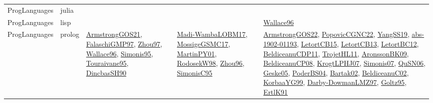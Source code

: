 {\begin{longtable}{lp{3cm}>{\raggedright}p{6cm}>{\raggedright}p{6cm}p{8cm}}
ProgLanguages & julia  &  &  & \\
ProgLanguages & lisp &  &  & \href{articles/Wallace96.pdf}{Wallace96}\cite{Wallace96}\\
ProgLanguages & prolog & \href{papers/ArmstrongGOS21.pdf}{ArmstrongGOS21}\cite{ArmstrongGOS21}, \href{articles/FalaschiGMP97.pdf}{FalaschiGMP97}\cite{FalaschiGMP97}, \href{articles/Zhou97.pdf}{Zhou97}\cite{Zhou97}, \href{articles/Wallace96.pdf}{Wallace96}\cite{Wallace96}, \href{papers/Simonis95.pdf}{Simonis95}\cite{Simonis95}, \href{papers/Touraivane95.pdf}{Touraivane95}\cite{Touraivane95}, \href{articles/DincbasSH90.pdf}{DincbasSH90}\cite{DincbasSH90} & \href{papers/Madi-WambaLOBM17.pdf}{Madi-WambaLOBM17}\cite{Madi-WambaLOBM17}, \href{papers/MossigeGSMC17.pdf}{MossigeGSMC17}\cite{MossigeGSMC17}, \href{articles/MartinPY01.pdf}{MartinPY01}\cite{MartinPY01}, \href{papers/RodosekW98.pdf}{RodosekW98}\cite{RodosekW98}, \href{papers/Zhou96.pdf}{Zhou96}\cite{Zhou96}, \href{papers/SimonisC95.pdf}{SimonisC95}\cite{SimonisC95} & \href{papers/ArmstrongGOS22.pdf}{ArmstrongGOS22}\cite{ArmstrongGOS22}, \href{papers/PopovicCGNC22.pdf}{PopovicCGNC22}\cite{PopovicCGNC22}, \href{papers/YangSS19.pdf}{YangSS19}\cite{YangSS19}, \href{articles/abs-1902-01193.pdf}{abs-1902-01193}\cite{abs-1902-01193}, \href{articles/LetortCB15.pdf}{LetortCB15}\cite{LetortCB15}, \href{papers/LetortCB13.pdf}{LetortCB13}\cite{LetortCB13}, \href{papers/LetortBC12.pdf}{LetortBC12}\cite{LetortBC12}, \href{articles/BeldiceanuCDP11.pdf}{BeldiceanuCDP11}\cite{BeldiceanuCDP11}, \href{articles/TrojetHL11.pdf}{TrojetHL11}\cite{TrojetHL11}, \href{papers/AronssonBK09.pdf}{AronssonBK09}\cite{AronssonBK09}, \href{papers/BeldiceanuCP08.pdf}{BeldiceanuCP08}\cite{BeldiceanuCP08}, \href{papers/KrogtLPHJ07.pdf}{KrogtLPHJ07}\cite{KrogtLPHJ07}, \href{articles/Simonis07.pdf}{Simonis07}\cite{Simonis07}, \href{papers/QuSN06.pdf}{QuSN06}\cite{QuSN06}, \href{papers/Geske05.pdf}{Geske05}\cite{Geske05}, \href{articles/PoderBS04.pdf}{PoderBS04}\cite{PoderBS04}, \href{papers/Bartak02.pdf}{Bartak02}\cite{Bartak02}, \href{papers/BeldiceanuC02.pdf}{BeldiceanuC02}\cite{BeldiceanuC02}, \href{papers/KorbaaYG99.pdf}{KorbaaYG99}\cite{KorbaaYG99}, \href{articles/Darby-DowmanLMZ97.pdf}{Darby-DowmanLMZ97}\cite{Darby-DowmanLMZ97}, \href{papers/Goltz95.pdf}{Goltz95}\cite{Goltz95}, \href{papers/ErtlK91.pdf}{ErtlK91}\cite{ErtlK91}\\

\end{longtable}}
